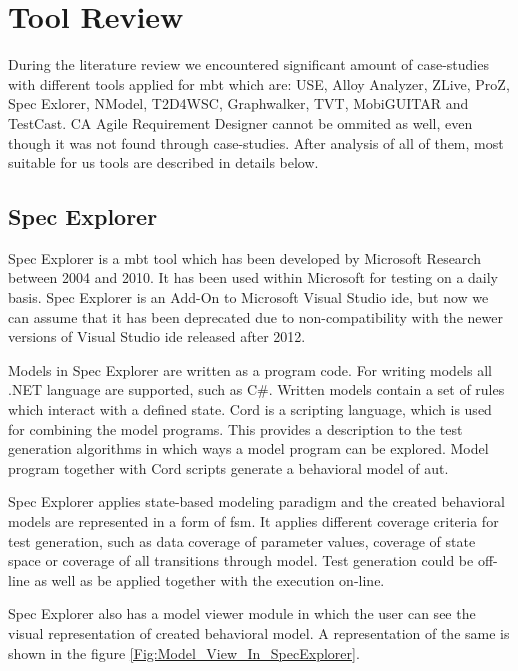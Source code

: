 \section{Tool Review}
During the literature review we encountered significant amount of case-studies with different tools applied for \acrshort{mbt} which are: USE, Alloy Analyzer, ZLive, ProZ, Spec Exlorer, NModel, T2D4WSC, Graphwalker, TVT, MobiGUITAR and TestCast. CA Agile Requirement Designer cannot be ommited as well, even though it was not found through case-studies. After analysis of all of them, most suitable for us tools are described in details below.

\subsection{Spec Explorer}
\par
Spec Explorer \cite{SpecExplorer_Description} is a \acrshort{mbt} tool which has been developed by Microsoft Research between 2004 and 2010. It has been used within Microsoft for testing on a daily basis. Spec Explorer is an Add-On to Microsoft Visual Studio \acrshort{ide}, but now we can assume that it has been deprecated due to non-compatibility with the newer versions of Visual Studio \acrshort{ide} released after 2012.
\par
Models in Spec Explorer are written as a program code. For writing models all .NET language are supported, such as C\#. Written models contain a set of rules which interact with a defined state. Cord is a scripting language, which is used for combining the model programs. This provides a description to the test generation algorithms in which ways a model program can be explored. Model program together with Cord scripts generate a behavioral model of \acrlong{aut}.

\par
Spec Explorer applies state-based modeling paradigm and the created behavioral models are represented in a form of \acrshort{fsm}. It applies different coverage criteria for test generation, such as data coverage of parameter values, coverage of state space or coverage of all transitions through model. Test generation could be off-line as well as be applied together with the execution on-line.

\par
Spec Explorer also has a model viewer module in which the user can see the visual representation of created behavioral model. A representation of the same is shown in the figure \ref{Fig:Model_View_In_SpecExplorer}.

